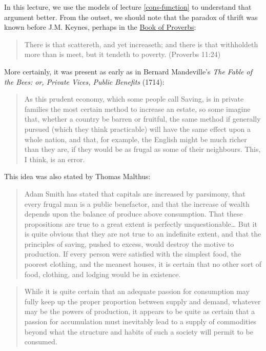 \documentclass[]{book}
\theoremstyle{definition}
\theoremstyle{definition}
\theoremstyle{definition}
\theoremstyle{remark}
\begin{document}
In this lecture, we use the models of lecture \ref{cons-function} to
understand that argument better. From the outset, we should note that
the paradox of thrift was known before J.M. Keynes, perhaps in the
\href{https://en.wikipedia.org/wiki/Book_of_Proverbs}{Book of Proverbs}:

\begin{quote}
There is that scattereth, and yet increaseth; and there is that
withholdeth more than is meet, but it tendeth to poverty. (Proverbs
11:24)
\end{quote}

More certainly, it was present as early as in Bernard Mandeville's
\emph{The Fable of the Bees: or, Private Vices, Public Benefits} (1714):

\begin{quote}
As this prudent economy, which some people call Saving, is in private
families the most certain method to increase an estate, so some imagine
that, whether a country be barren or fruitful, the same method if
generally pursued (which they think practicable) will have the same
effect upon a whole nation, and that, for example, the English might be
much richer than they are, if they would be as frugal as some of their
neighbours. This, I think, is an error.
\end{quote}

This idea was also stated by Thomas Malthus:

\begin{quote}
Adam Smith has stated that capitals are increased by parsimony, that
every frugal man is a public benefactor, and that the increase of wealth
depends upon the balance of produce above consumption. That these
propositions are true to a great extent is perfectly
unquestionable\ldots{} But it is quite obvious that they are not true to
an indefinite extent, and that the principles of saving, pushed to
excess, would destroy the motive to production. If every person were
satisfied with the simplest food, the poorest clothing, and the meanest
houses, it is certain that no other sort of food, clothing, and lodging
would be in existence.
\end{quote}

\begin{quote}
While it is quite certain that an adequate passion for consumption may
fully keep up the proper proportion between supply and demand, whatever
may be the powers of production, it appears to be quite as certain that
a passion for accumulation must inevitably lead to a supply of
commodities beyond what the structure and habits of such a society will
permit to be consumed.
\end{quote}
\end{document}
